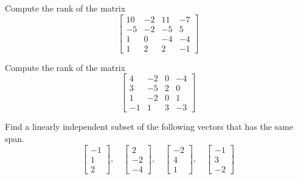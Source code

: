 \documentclass{ximera}
\begin{document}
\begin{exercise}
    Compute the rank of the matrix
    \begin{equation*}
        \begin{bmatrix}
            10 & -2 & 11 & -7 \\ 
            -5 & -2 & -5 & 5 \\
            1 & 0 & -4 & -4 \\
            1 & 2 & 2 & -1
        \end{bmatrix} 
    \end{equation*}
\end{exercise}

\begin{exercise}
    Compute the rank of the matrix
    \begin{equation*}
        \begin{bmatrix}
            4 & -2 & 0 & -4 \\
            3 & -5 & 2 & 0 \\
            1 & -2 & 0 & 1 \\
            -1 & 1 & 3 & -3
        \end{bmatrix} 
    \end{equation*}
\end{exercise}

\begin{exercise}
    Find a linearly independent subset of the following vectors that has the same span.
    \begin{equation*}
        \begin{bmatrix}
            -1 \\ 
            1 \\ 
            2
        \end{bmatrix}
        , \quad
        \begin{bmatrix}
            2 \\ 
            -2 \\ 
            -4
        \end{bmatrix}
        , \quad
        \begin{bmatrix}
            -2 \\ 
            4 \\ 
            1
        \end{bmatrix}
        , \quad
        \begin{bmatrix}
            -1 \\ 
            3 \\ 
            -2
        \end{bmatrix}
    \end{equation*}
\end{exercise}
\end{document}
